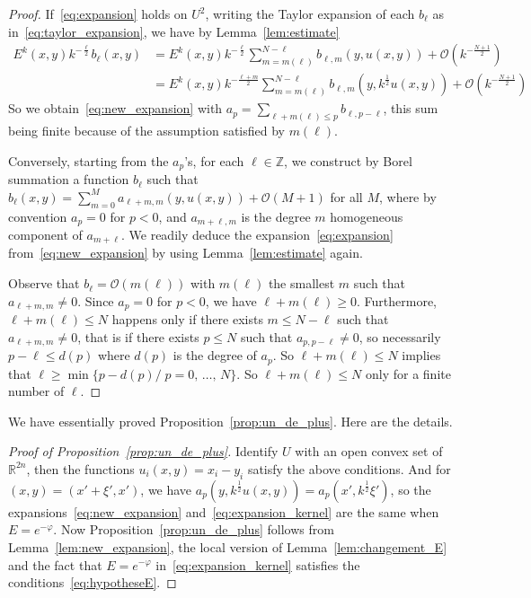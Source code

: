 \documentclass[10pt,a4paper]{article}
\theoremstyle{definition}
\numberwithin{equation}{section}
\newcommand{\R}{{\mathbb{R}}}
\newcommand{\Z}{{\mathbb{Z}}}
\newcommand{\bigo}{\mathcal{O}}
\begin{document}
\begin{proof}
If~\eqref{eq:expansion} holds on $U^2$, writing the Taylor
expansion of each $b_{\ell}$ as in~\eqref{eq:taylor_expansion}, we have by Lemma~\ref{lem:estimate}
\begin{align*}
E^k (x,y) k^{-\frac{\ell}{2}} b_{\ell} (x,y) &= E^k (x,y) k^{-
\frac{\ell}{2}} \sum_{m = m (\ell) }^{N- \ell } b_{\ell,m} (y, u(x,y)) +
\bigo\left(k^{-\frac{N+1}{2}}\right)\\
&=E^k (x,y) k^{-\frac{\ell +m }{2}} \sum_{m = m (\ell) }^{N- \ell } b_{\ell,m} \left(y,k^{\frac{1}{2}} u(x,y)\right) +
\bigo\left(k^{-\frac{N+1}{2}}\right)
\end{align*}
So we obtain~\eqref{eq:new_expansion} with $ a_p = \sum _{\ell + m (\ell)
\leqslant p } b_{\ell, p - \ell} $, this sum being finite because of the assumption satisfied by $m(\ell) $.

Conversely, starting from the $a_{p}$'s, for each $\ell \in \Z$, we construct by Borel summation a function $b_{\ell}$ such that $ b_{\ell} (x, y)=
\sum _{m =0 }^{M} a _{ \ell+m, m}(y,u (x,y)) + \bigo (M+1)$ for all $M$, where by convention $a_{p}=0$ for $p<0$, and $a_{m+\ell, m}$ is the degree $m$ homogeneous component of $a_{m+\ell}$. We readily deduce the expansion~\eqref{eq:expansion} from~\eqref{eq:new_expansion} by using Lemma~\ref{lem:estimate} again.

Observe that $b_{\ell} =
\bigo(m(\ell))$ with $m(\ell)$ the smallest $m$ such that $a_{\ell + m, m } \neq 0$. Since $a_{p} = 0$ for $p<0$, we have $\ell + m(\ell)
\geqslant 0$. Furthermore, $\ell + m (\ell) \leqslant N$ happens only if there exists $m \leqslant N - \ell$ such that $a_{\ell + m, m } \neq 0$, that is if there exists $p \leqslant N$ such that $ a _{p, p-\ell } \neq 0$, so necessarily $ p - \ell \leqslant d (p)$ where $d(p)$ is the degree of $a_p$. So $\ell + m (\ell) \leqslant N$ implies that $\ell \geqslant \min \{ p - d(p) / \; p =0,\,\ldots,\, N \}$. So $\ell + m (\ell) \leqslant N$ only for a finite number of $\ell$.
\end{proof}
 We have essentially proved Proposition~\ref{prop:un_de_plus}. Here are the details.

\begin{proof}[Proof of Proposition~\ref{prop:un_de_plus}]
Identify $U$ with an open convex set of $\R^{2n}$, then the functions $u_i(x,y)= x_i -y_i$ satisfy the above conditions. And for $(x,y) = (x' + \xi', x')$, we have $a_p (y, k^{\frac{1}{2}} u(x,y)) = a_p (x', k^{\frac{1}{2}} \xi')$, so the expansions~\eqref{eq:new_expansion} and~\eqref{eq:expansion_kernel} are the same when $E=e^{-\varphi}$. Now Proposition~\ref{prop:un_de_plus} follows from Lemma~\ref{lem:new_expansion}, the local version of Lemma~\ref{lem:changement_E} and the fact that $E=e^{-\varphi}$ in~\eqref{eq:expansion_kernel} satisfies the conditions~\eqref{eq:hypotheseE}.
\end{proof}
\end{document}
